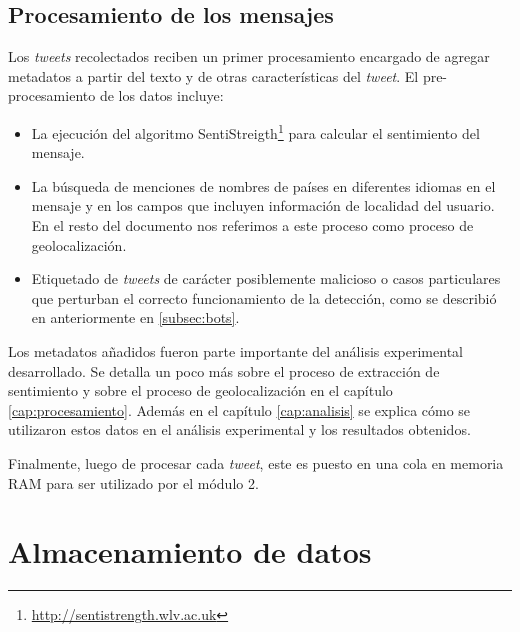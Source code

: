 \subsection{Procesamiento de los mensajes}
Los \textit{tweets} recolectados reciben un primer procesamiento encargado de agregar metadatos a partir del texto y de otras características del \textit{tweet}. El pre-procesamiento de los datos incluye:
\begin{itemize}
\item La ejecución del algoritmo SentiStreigth\footnote{\url{http://sentistrength.wlv.ac.uk}} para calcular el sentimiento del mensaje.
\item La búsqueda de menciones de nombres de países en diferentes idiomas en el mensaje y en los campos que incluyen información de localidad del usuario. En el resto del documento nos referimos a este proceso como proceso de geolocalización.
\item Etiquetado de \textit{tweets} de carácter posiblemente malicioso o casos particulares que perturban el correcto funcionamiento de la detección, como se describió en anteriormente en \ref{subsec:bots}.%
\end{itemize}

Los metadatos añadidos fueron parte importante del análisis experimental desarrollado. Se detalla un poco más sobre el proceso de extracción de sentimiento y sobre el proceso de geolocalización en el capítulo \ref{cap:procesamiento}. Además en el capítulo \ref{cap:analisis} se explica cómo se utilizaron estos datos en el análisis experimental y los resultados obtenidos.

Finalmente, luego de procesar cada \textit{tweet}, este es puesto en una cola en memoria RAM para ser utilizado por el módulo 2.

\section{Almacenamiento de datos}

